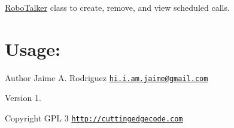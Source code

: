 \hyperlink{class_robo_talker}{Robo\-Talker} class to create, remove, and view scheduled calls.\hypertarget{nav1_usage}{}\section{Usage\-:}\label{nav1_usage}



\begin{DoxyAuthor}{Author}
Jaime A. Rodriguez \href{mailto:hi.i.am.jaime@gmail.com}{\tt hi.\-i.\-am.\-jaime@gmail.\-com} 
\end{DoxyAuthor}
\begin{DoxyVersion}{Version}
1. 
\end{DoxyVersion}
\begin{DoxyCopyright}{Copyright}
G\-P\-L 3 \href{http://cuttingedgecode.com}{\tt http\-://cuttingedgecode.\-com} 
\end{DoxyCopyright}

